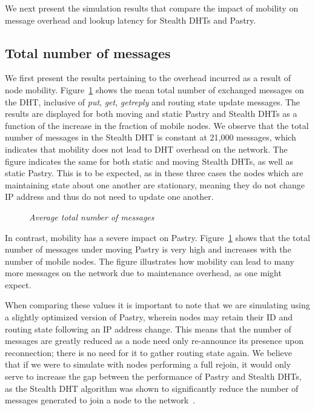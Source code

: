 \documentclass[conference]{IEEEtran}
\begin{document}
We next present the simulation results that compare  the impact of
mobility on message overhead and lookup latency for Stealth DHTs and
Pastry.

\subsection{Total number of messages}
We first present the results pertaining to the overhead incurred as
a result of node mobility. Figure~\ref{fig:msg} shows the mean total
number of exchanged messages on the DHT, inclusive of {\em put},
{\em get}, {\em getreply} and routing state update messages. The
results are displayed for both moving and static Pastry and Stealth
DHTs as a function of the increase in the fraction of mobile nodes.
We observe that the total number of messages in the Stealth DHT is
constant at 21,000 messages, which indicates that mobility does not
lead to DHT overhead on the network. The figure indicates the same
for both static and moving Stealth DHTs, as well as static Pastry.
This is to be expected, as in these three cases the nodes which are
maintaining state about one another are stationary, meaning they do
not change IP address and thus do not need to update one another.

\begin{figure}[htb]
\centering {}
\caption{\em Average total number of messages} \label{fig:msg}
\end{figure}

In contrast, mobility has a severe impact on Pastry.
Figure~\ref{fig:msg} shows that the total number of messages under
moving Pastry is very high and increases with the number of mobile
nodes. The figure illustrates how mobility can lead to many more
messages on the network due to maintenance overhead, as one might
expect.

When comparing these values it is important to note that we are
simulating using a slightly optimized version of Pastry, wherein
nodes may retain their ID and routing state following an IP address
change. This means that the number of messages are greatly reduced
as a node need only re-announce its presence upon reconnection;
there is no need for it to gather routing state again. We believe
that if we were to simulate with nodes performing a full rejoin, it
would only serve to increase the gap between the performance of
Pastry and Stealth DHTs, as the Stealth DHT algorithm was shown to
significantly reduce the number of messages generated to join a node
to the network~\cite{stealth1}.
\end{document}

